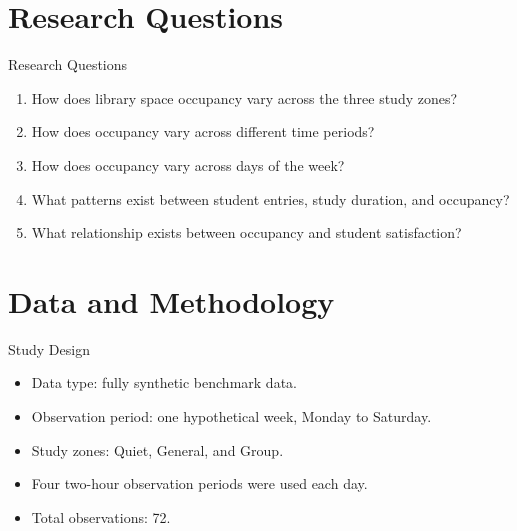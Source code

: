 \documentclass[aspectratio=169,11pt]{beamer}
\begin{document}
\section{Research Questions}

\begin{frame}{Research Questions}
    \begin{enumerate}
        \item How does library space occupancy vary across the three study zones?
        \item How does occupancy vary across different time periods?
        \item How does occupancy vary across days of the week?
        \item What patterns exist between student entries, study duration, and occupancy?
        \item What relationship exists between occupancy and student satisfaction?
    \end{enumerate}
\end{frame}

\section{Data and Methodology}

\begin{frame}{Study Design}
    \begin{itemize}
        \item Data type: fully synthetic benchmark data.
        \item Observation period: one hypothetical week, Monday to Saturday.
        \item Study zones: Quiet, General, and Group.
        \item Four two-hour observation periods were used each day.
        \item Total observations: 72.
    \end{itemize}
\end{frame}
\end{document}
